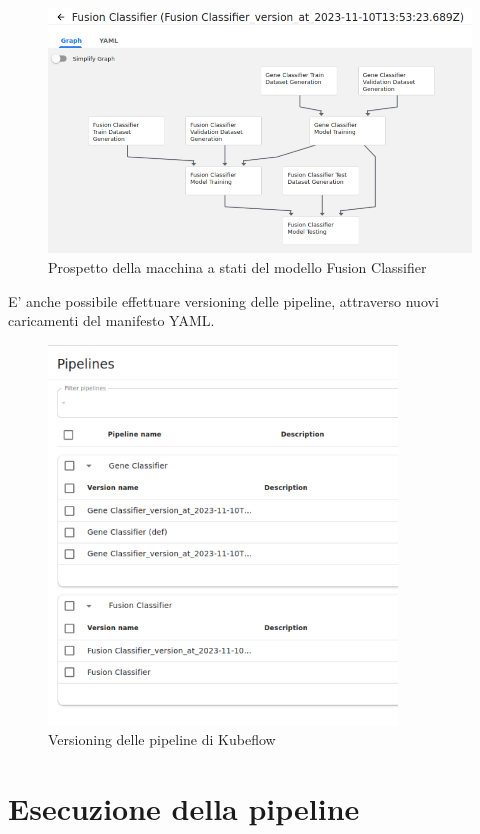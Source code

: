 \begin{figure}[h]
    \centering
    \includegraphics[width=\linewidth]{figures/ch4and5/fusion_stale.png}
    \caption[Prospetto della macchina a stati del modello Fusion Classifier]{Prospetto della macchina a stati del modello Fusion Classifier}
    \label{fig:cha6:fusion_stale}
\end{figure}

E' anche possibile effettuare versioning delle pipeline, attraverso nuovi caricamenti del manifesto YAML.

\begin{figure}[h]
    \centering
    \includegraphics[width=350px]{figures/ch4and5/vers.png}
    \caption[Versioning delle pipeline di Kubeflow]{Versioning delle pipeline di Kubeflow}
    \label{fig:cha6:versions}
\end{figure}

\section{Esecuzione della pipeline}

